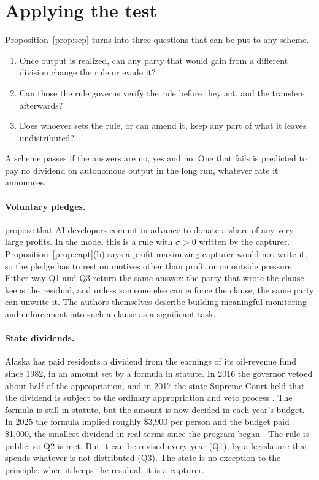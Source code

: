 \section{Applying the test}\label{sec:test}

Proposition~\ref{prop:sep} turns into three questions that can be put to any scheme.
\begin{enumerate}[label=Q\arabic*.,leftmargin=2.6em]
\item Once output is realized, can any party that would gain from a different division
      change the rule or evade it?
\item Can those the rule governs verify the rule before they act, and the transfers
      afterwards?
\item Does whoever sets the rule, or can amend it, keep any part of what it leaves
      undistributed?
\end{enumerate}
A scheme passes if the answers are no, yes and no. One that fails is predicted to pay no
dividend on autonomous output in the long run, whatever rate it announces.

\paragraph{Voluntary pledges.} \citet{OKeefe2020} propose that AI developers commit in
advance to donate a share of any very large profits. In the model this is a rule with
$\sigma>0$ written by the capturer. Proposition~\ref{prop:capt}(b) says a profit-maximizing
capturer would not write it, so the pledge has to rest on motives other than profit or on
outside pressure. Either way Q1 and Q3 return the same answer: the party that wrote the
clause keeps the residual, and unless someone else can enforce the clause, the same party
can unwrite it. The authors themselves describe building meaningful monitoring and
enforcement into such a clause as a significant task.

\paragraph{State dividends.} Alaska has paid residents a dividend from the earnings of
its oil-revenue fund since 1982, in an amount set by a formula in statute. In 2016 the
governor vetoed about half of the appropriation, and in 2017 the state Supreme Court held
that the dividend is subject to the ordinary appropriation and veto process
\citep{Wielechowski2017}. The formula is still in statute, but the amount is now decided
in each year's budget. In 2025 the formula implied roughly \$3,900 per person and the
budget paid \$1,000, the smallest dividend in real terms since the program began
\citep{AlaskaPublic2025,AlaskaDOR2025}. The rule is public, so Q2 is
met. But it can be revised every year (Q1), by a legislature that spends whatever is not
distributed (Q3). The state is no exception to the principle: when it keeps the residual,
it is a capturer.

